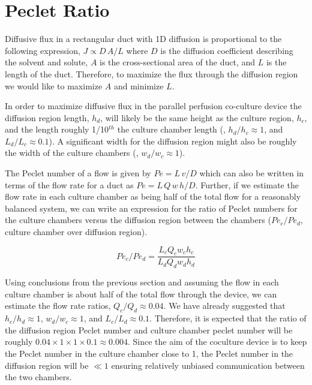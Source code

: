 \section{Peclet Ratio}

Diffusive flux in a rectangular duct with 1D diffusion is proportional to the following expression, $J \propto D\,A/L$ where $D$ is the diffusion coefficient describing the solvent and solute, $A$ is the cross-sectional area of the duct, and $L$ is the length of the duct. Therefore, to maximize the flux through the diffusion region we would like to maximize $A$ and minimize $L$.

In order to maximize diffusive flux in the parallel perfusion co-culture device the diffusion region length, $h_{d}$, will likely be the same height as the culture region, $h_{c}$, and the length roughly 1/10$^{th}$ the culture chamber length (\ie , $h_{d}/h_{c} \approx 1$, and $L_{d}/L_{c} \approx 0.1$). A significant width for the diffusion region might also be roughly the width of the culture chambers (\ie , $w_{d}/w_{c} \approx 1$).

The Peclet number of a flow is given by $Pe = L\,v/D$ which can also be written in terms of the flow rate for a duct as $Pe = L\, Q \, w \, h/D$. Further, if we estimate the flow rate in each culture chamber as being half of the total flow for a reasonably balanced system, we can write an expression for the ratio of Peclet numbers for the culture chambers versus the diffusion region between the chambers ($Pe_{c}/Pe_{d}$, culture chamber over diffusion region).

\begin{equation}
Pe_{c}/Pe_{d} = \frac{L_{c}Q_{c}w_{c}h_{c}}{L_{d}Q_{d}w_{d}h_{d}}
\end{equation}

Using conclusions from the previous section and assuming the flow in each culture chamber is about half of the total flow through the device, we can estimate the flow rate ratios, $Q_{c}/Q_{d} \approx 0.04$. We have already suggested that $h_{c}/h_{d} \approx 1$, $w_{d}/w_{c} \approx 1$, and $L_{c}/L_{d} \approx 0.1$. Therefore, it is expected that the ratio of the diffusion region Peclet number and culture chamber peclet number will be roughly $0.04 \times 1 \times 1 \times 0.1 \approx 0.004$. Since the aim of the coculture device is to keep the Peclet number in the culture chamber close to 1, the Peclet number in the diffusion region will be $\ll 1$ ensuring relatively unbiased communication between the two chambers.


